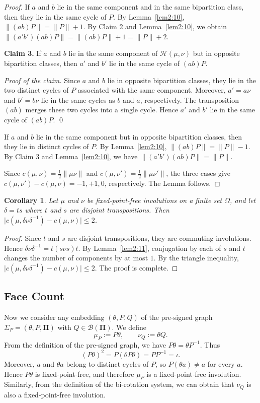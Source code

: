 \documentclass[12pt]{article}
\newtheorem{corollary}[theorem]{Corollary}
\theoremstyle{definition}
\begin{document}
\begin{proof}
\medskip
If $a$ and $b$ lie in the same component and in the same bipartition class, then they lie in the same cycle of $P$. By Lemma~\ref{lem2:10},
$\lVert(ab)P\rVert=\lVert P\rVert+1$.
By Claim 2 and Lemma~\ref{lem2:10}, we obtain
$\lVert (a'b')(ab)P\rVert=\lVert(ab)P\rVert+1=\lVert P\rVert+2$.


\medskip
\noindent\textbf{Claim 3.}
If $a$ and $b$ lie in the same component of $\mathcal H(\mu,\nu)$ but in opposite bipartition classes, then $a'$ and $b'$ lie in the same cycle of $(ab)P$.

\smallskip
\noindent\emph{Proof of the claim.}
Since $a$ and $b$ lie in opposite bipartition classes, they lie in the two distinct cycles of $P$ associated with the same component. Moreover, $a'=a\nu$ and $b'=b\nu$ lie in the same cycles as
$b$ and $a$, respectively. The transposition $(ab)$ merges these two cycles into a single cycle. Hence $a'$ and $b'$ lie in the same cycle of $(ab)P$.  \qed

\medskip
If $a$ and $b$ lie in the same component but in opposite bipartition classes, then they lie in distinct cycles of $P$. By Lemma~\ref{lem2:10},
$\lVert(ab)P\rVert=\lVert P\rVert-1$.
By  Claim 3 and Lemma~\ref{lem2:10}, we have $\lVert (a'b')(ab)P\rVert=\lVert P\rVert$.


Since $c(\mu,\nu)=\frac12\lVert\mu\nu\rVert$ and
$c(\mu,\nu')=\frac12\lVert\mu\nu'\rVert$, the three cases give
$c(\mu,\nu')-c(\mu,\nu)=-1,+1,0$, respectively.  The Lemma follows.
\end{proof}


\begin{corollary}
\label{cor2:12}
Let $\mu$ and $\nu$ be fixed-point-free involutions on a finite set $\Omega$, and let $\delta=ts$ where $t$ and $s$ are disjoint transpositions. Then
$\bigl|c(\mu,\delta\nu\delta^{-1})-c(\mu,\nu)\bigr|\leq 2$.
\end{corollary}

\begin{proof}
Since $t$ and $s$ are disjoint transpositions, they are commuting involutions. Hence
$\delta\nu\delta^{-1}=t(s\nu s)t$.
By Lemma~\ref{lem2:11}, conjugation by each of $s$ and $t$ changes the number of components by at most $1$. By the triangle inequality,
$\bigl|c(\mu,\delta\nu\delta^{-1})-c(\mu,\nu)\bigr|\leq 2$. The proof is complete.
\end{proof}

\subsection{Face Count}
 Now we consider any embedding $(\theta,P,Q)$ of the pre-signed graph $\Sigma_P=(\theta,P,\mathbf{\Pi})$ with $Q\in\mathcal B(\mathbf{\Pi})$. We define
$$ \mu_P:=P\theta,
  \qquad
  \nu_Q:=\theta Q.$$
From the definition of the pre-signed graph, we have $P\theta=\theta P^{-1}$. Thus
\[
(P\theta)^2=P(\theta P\theta)=PP^{-1}=\iota.
\]Moreover, $a$ and $\theta a$ belong to distinct cycles of $P$,
so $P(\theta a)\neq a$ for every $a$. Hence $P\theta$ is
fixed-point-free, and therefore $\mu_P$ is a
fixed-point-free involution. Similarly, from the definition of the bi-rotation system, we can obtain that $\nu_Q$ is also a
fixed-point-free involution.
\end{document}
